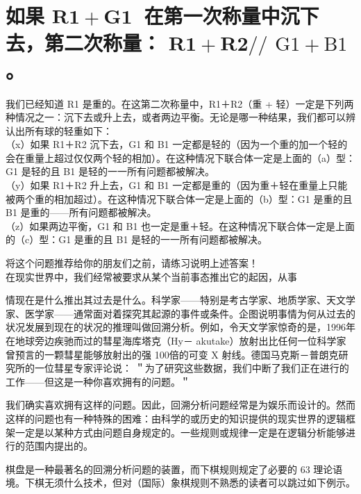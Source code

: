 \section*{如果 $\mathbf{R 1 + G 1 ~}$ 在第一次称量中沉下去，第二次称量： $\mathbf{R 1 + R 2 / /}$ $\mathrm{G} 1+\mathrm{B} 1$ 。}
我们已经知道 R1 是重的。在这第二次称量中，R1＋R2（重 + 轻）一定是下列两种情况之一：沉下去或升上去，或者两边平衡。无论是哪一种结果，我们都可以辨认出所有球的轻重如下：\\
（x）如果 R1＋R2 沉下去，G1 和 B1 一定都是轻的（因为一个重的加一个轻的会在重量上超过仅仅两个轻的相加）。在这种情况下联合体一定是上面的（a）型：G1 是轻的且 B1 是轻的一一所有问题都被解决。\\
（y）如果 R1＋R2 升上去，G1 和 B1 一定都是重的（因为重＋轻在重量上只能被两个重的相加超过）。在这种情况下联合体一定是上面的（b）型：G1 是重的且 B1 是重的——所有问题都被解决。\\
（z）如果两边平衡，G1 和 B1 也一定是重＋轻。在这种情况下联合体一定是上面的（c）型：G1 是重的且 B1 是轻的一一所有问题都被解决。

将这个问题推荐给你的朋友们之前，请练习说明上述答案！\\
在现实世界中，我们经常被要求从某个当前事态推出它的起因，从事

情现在是什么推出其过去是什么。科学家——特别是考古学家、地质学家、天文学家、医学家——通常面对着探究其起源的事件或条件。企图说明事情为何从过去的状况发展到现在的状况的推理叫做回溯分析。例如，令天文学家惊奇的是，1996年在地球旁边疾驰而过的彗星海库塔克（Hy－ akutake）放射出比任何一位科学家曾预言的一颗彗星能够放射出的强 100倍的可变 X 射线。德国马克斯－普朗克研究所的一位彗星专家评论说： ＂为了研究这些数据，我们中断了我们正在进行的工作——但这是一种你喜欢拥有的问题。＂

我们确实喜欢拥有这样的问题。因此，回溯分析问题经常是为娱乐而设计的。然而这样的问题也有一种特殊的困难：由科学的或历史的知识提供的现实世界的逻辑框架一定是以某种方式由问题自身规定的。一些规则或规律一定是在逻辑分析能够进行的范围内提出的。

棋盘是一种最著名的回溯分析问题的装置，而下棋规则规定了必要的 63 理论语境。下棋无须什么技术，但对（国际）象棋规则不熟悉的读者可以跳过如下例示。

